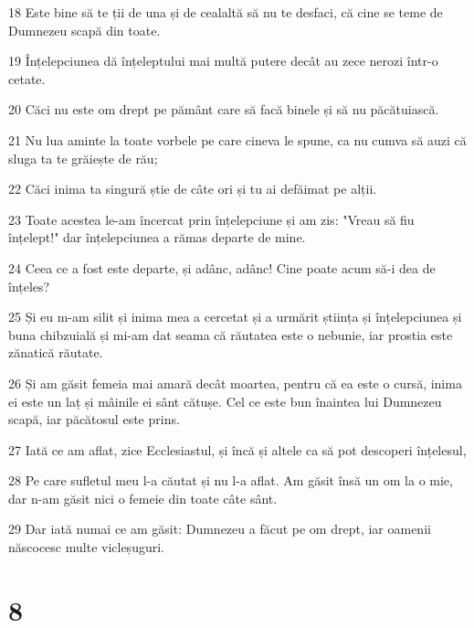 \par 18 Este bine să te ții de una și de cealaltă să nu te desfaci, că cine se teme de Dumnezeu scapă din toate.
\par 19 Înțelepciunea dă înțeleptului mai multă putere decât au zece nerozi într-o cetate.
\par 20 Căci nu este om drept pe pământ care să facă binele și să nu păcătuiască.
\par 21 Nu lua aminte la toate vorbele pe care cineva le spune, ca nu cumva să auzi că sluga ta te grăiește de rău;
\par 22 Căci inima ta singură știe de câte ori și tu ai defăimat pe alții.
\par 23 Toate acestea le-am încercat prin înțelepciune și am zis: "Vreau să fiu înțelept!" dar înțelepciunea a rămas departe de mine.
\par 24 Ceea ce a fost este departe, și adânc, adânc! Cine poate acum să-i dea de înțeles?
\par 25 Și eu m-am silit și inima mea a cercetat și a urmărit știința și înțelepciunea și buna chibzuială și mi-am dat seama că răutatea este o nebunie, iar prostia este zănatică răutate.
\par 26 Și am găsit femeia mai amară decât moartea, pentru că ea este o cursă, inima ei este un laț și mâinile ei sânt cătușe. Cel ce este bun înaintea lui Dumnezeu scapă, iar păcătosul este prins.
\par 27 Iată ce am aflat, zice Ecclesiastul, și încă și altele ca să pot descoperi înțelesul,
\par 28 Pe care sufletul meu l-a căutat și nu l-a aflat. Am găsit însă un om la o mie, dar n-am găsit nici o femeie din toate câte sânt.
\par 29 Dar iată numai ce am găsit: Dumnezeu a făcut pe om drept, iar oamenii născocesc multe vicleșuguri.

\chapter{8}

